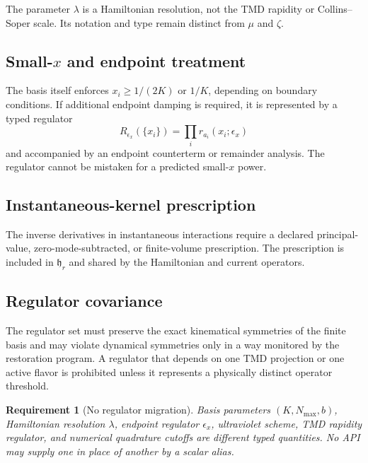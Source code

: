 \documentclass[11pt]{article}
\newtheorem{requirement}[definition]{Requirement}
\begin{document}
The parameter \(\lambda\) is a Hamiltonian resolution, not the TMD rapidity or
Collins--Soper scale.  Its notation and type remain distinct from \(\mu\) and
\(\zeta\).

\subsection{\texorpdfstring{Small-\(x\)}{Small-x} and endpoint treatment}

The basis itself enforces \(x_i\geq 1/(2K)\) or \(1/K\), depending on boundary
conditions.  If additional endpoint damping is required, it is represented by
a typed regulator
\begin{equation}
 R_{\epsilon_x}(\{x_i\})
 =\prod_i r_{a_i}(x_i;\epsilon_x)
 \label{eq:endpoint-regulator}
\end{equation}
and accompanied by an endpoint counterterm or remainder analysis.  The
regulator cannot be mistaken for a predicted small-\(x\) power.

\subsection{Instantaneous-kernel prescription}

The inverse derivatives in instantaneous interactions require a declared
principal-value, zero-mode-subtracted, or finite-volume prescription.  The
prescription is included in \(\mathfrak h_r\) and shared by the Hamiltonian and
current operators.

\subsection{Regulator covariance}

The regulator set must preserve the exact kinematical symmetries of the finite
basis and may violate dynamical symmetries only in a way monitored by the
restoration program.  A regulator that depends on one TMD projection or one
active flavor is prohibited unless it represents a physically distinct
operator threshold.

\begin{requirement}[No regulator migration]
Basis parameters \((K,N_{\max},b)\), Hamiltonian resolution \(\lambda\),
endpoint regulator \(\epsilon_x\), ultraviolet scheme, TMD rapidity regulator,
and numerical quadrature cutoffs are different typed quantities.  No API may
supply one in place of another by a scalar alias.
\label{req:no-regulator-migration}
\end{requirement}
\end{document}
